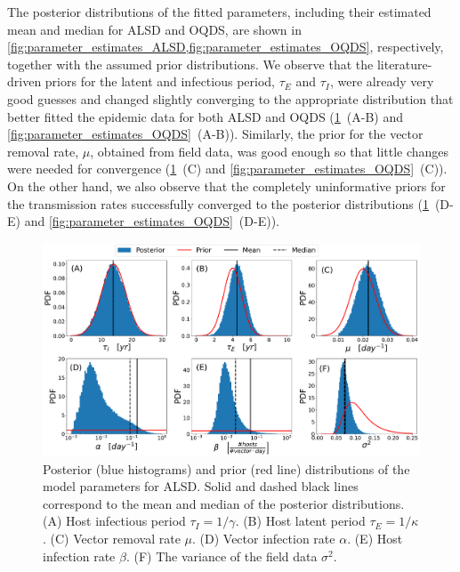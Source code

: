 The posterior distributions of the fitted parameters, including their
estimated mean and median for ALSD and OQDS, are shown in
\cref{fig:parameter_estimates_ALSD,fig:parameter_estimates_OQDS}, respectively,
together with the assumed prior distributions. We observe that the
literature-driven priors for the latent and infectious period, $\tau_E$ and
$\tau_I$, were already very good guesses and changed slightly converging to the
appropriate distribution that better fitted the epidemic data for both ALSD and
OQDS (\cref{fig:parameter_estimates_ALSD}~\textcolor{ref_color}{(A-B)} and
\cref{fig:parameter_estimates_OQDS}~\textcolor{ref_color}{(A-B)}). Similarly,
the prior for the vector
removal rate, $\mu$, obtained from field data, was good enough so that little
changes were needed for convergence
(\cref{fig:parameter_estimates_ALSD}~\textcolor{ref_color}{(C)}
and
\cref{fig:parameter_estimates_OQDS}~\textcolor{ref_color}{(C)}). On the other
hand, we also observe
that the completely uninformative priors for the transmission rates
successfully converged to the posterior distributions
(\cref{fig:parameter_estimates_ALSD}~\textcolor{ref_color}{(D-E)} and
\cref{fig:parameter_estimates_OQDS}~\textcolor{ref_color}{(D-E)}).

\begin{figure}[H]
    \centering
    \includegraphics[width=1\textwidth]{Figures/Parameter_estimates_ALSD.pdf}
    \caption[Posterior and prior distributions of the model parameters for
        ALSD]{Posterior (blue histograms) and prior (red line) distributions
        of the model parameters for ALSD. Solid and dashed black lines
        correspond to
        the mean and median of the posterior distributions. (A) Host infectious
        period
        $\tau_I=1/\gamma$. (B) Host latent period $\tau_E=1/\kappa$.  (C)
        Vector
        removal rate $\mu$. (D) Vector infection rate $\alpha$. (E) Host
        infection rate
        $\beta$. (F) The variance of the field data $\sigma^2$.}
    \label{fig:parameter_estimates_ALSD}
\end{figure}

